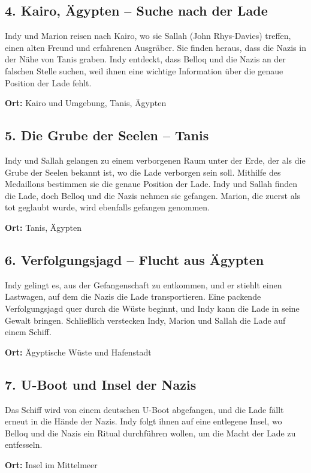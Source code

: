 \documentclass[a4paper]{article}
\begin{document}
\subsection*{4. Kairo, Ägypten – Suche nach der Lade}
Indy und Marion reisen nach Kairo, wo sie Sallah (John Rhys-Davies) treffen, einen alten Freund und erfahrenen Ausgräber. Sie finden heraus, dass die Nazis in der Nähe von Tanis graben. Indy entdeckt, dass Belloq und die Nazis an der falschen Stelle suchen, weil ihnen eine wichtige Information über die genaue Position der Lade fehlt.
\begin{itemize}
  \begin{item}
    \textbf{Ort:} Kairo und Umgebung, Tanis, Ägypten
  \end{item}
\end{itemize}
\subsection*{5. Die Grube der Seelen – Tanis}
Indy und Sallah gelangen zu einem verborgenen Raum unter der Erde, der als die Grube der Seelen bekannt ist, wo die Lade verborgen sein soll. Mithilfe des Medaillons bestimmen sie die genaue Position der Lade. Indy und Sallah finden die Lade, doch Belloq und die Nazis nehmen sie gefangen. Marion, die zuerst als tot geglaubt wurde, wird ebenfalls gefangen genommen.
\begin{itemize}
  \begin{item}
    \textbf{Ort:} Tanis, Ägypten
  \end{item}
\end{itemize}
\subsection*{6. Verfolgungsjagd – Flucht aus Ägypten}
Indy gelingt es, aus der Gefangenschaft zu entkommen, und er stiehlt einen Lastwagen, auf dem die Nazis die Lade transportieren. Eine packende Verfolgungsjagd quer durch die Wüste beginnt, und Indy kann die Lade in seine Gewalt bringen. Schließlich verstecken Indy, Marion und Sallah die Lade auf einem Schiff.
\begin{itemize}
  \begin{item}
    \textbf{Ort:} Ägyptische Wüste und Hafenstadt
  \end{item}
\end{itemize}
\subsection*{7. U-Boot und Insel der Nazis}
Das Schiff wird von einem deutschen U-Boot abgefangen, und die Lade fällt erneut in die Hände der Nazis. Indy folgt ihnen auf eine entlegene Insel, wo Belloq und die Nazis ein Ritual durchführen wollen, um die Macht der Lade zu entfesseln.
\begin{itemize}
  \begin{item}
    \textbf{Ort:} Insel im Mittelmeer
  \end{item}
\end{itemize}
\end{document}
